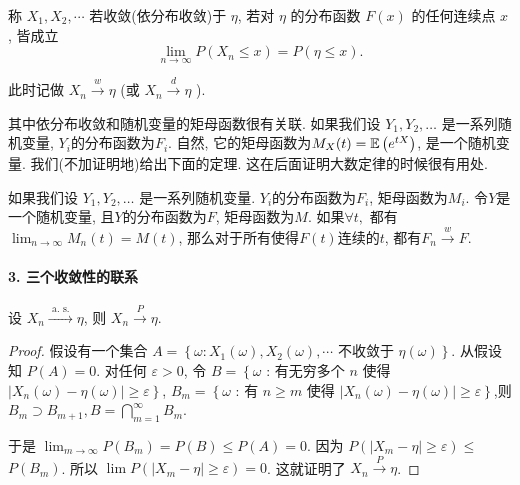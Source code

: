 \begin{definition}
    称 $X_1, X_2, \cdots$ 若收敛(依分布收敛)于 $\eta$, 若对 $\eta$ 的分布函数 $F(x)$ 的任何连续点 $x$, 皆成立
    $$
    \lim _{n \rightarrow \infty} P\left(X_n \leq x\right)=P(\eta \leq x) .
    $$
    
    此时记做 $X_n \stackrel{w}{\longrightarrow} \eta$ (或 $X_n \stackrel{d}{\longrightarrow} \eta$ ).
\end{definition}

其中依分布收敛和随机变量的矩母函数很有关联. 如果我们设 $Y_1, Y_2, \dots$ 是一系列随机变量, $Y_i$的分布函数为$F_i$. 自然, 它的矩母函数为$M_X(t)=\mathbb E\left( e^{t X}\right)$, 是一个随机变量. 我们(不加证明地)给出下面的定理. 这在后面证明大数定律的时候很有用处. 

\begin{theorem}
    \label{thm:dist-moment}
    如果我们设 $Y_1, Y_2, \dots$ 是一系列随机变量. $Y_i$的分布函数为$F_i$, 矩母函数为$M_i$. 令$Y$是一个随机变量, 且$Y$的分布函数为$F$, 矩母函数为$M$. 如果$\forall t,$ 都有$\lim _{n \rightarrow \infty} M_n(t)=M(t)$, 那么对于所有使得$F(t)$连续的$t$, 都有$F_n \stackrel{w}{\longrightarrow} F$. 
\end{theorem}

\paragraph{3. 三个收敛性的联系}

\begin{theorem}
    设 $X_n \stackrel{\text { a. s. }}{\longrightarrow} \eta$, 则 $X_n \stackrel{P}{\longrightarrow} \eta$.
\end{theorem}

\begin{proof}
    假设有一个集合 $A=\left\{\omega: X_1(\omega), X_2(\omega), \cdots\right.$ 不收敛于 $\left.\eta(\omega)\right\}$. 从假设知 $P(A)=0$. 对任何 $\varepsilon>0$, 令
$B=\left\{\omega\right.$ : 有无穷多个 $n$ 使得 $\left.\left|X_n(\omega)-\eta(\omega)\right| \geq \varepsilon\right\}$,
$B_m=\left\{\omega\right.$ : 有 $n \geq m$ 使得 $\left.\left|X_n(\omega)-\eta(\omega)\right| \geq \varepsilon\right\}$,则 $B_m \supset B_{m+1}, B=\bigcap_{m=1}^{\infty} B_m$.

于是 $\lim _{m \rightarrow \infty} P\left(B_m\right)=P(B) \leq P(A)=0$. 因为 $P\left(\left|X_m-\eta\right| \geq \varepsilon\right) \leq$ $P\left(B_m\right)$. 所以 $\lim P\left(\left|X_m-\eta\right| \geq \varepsilon\right)=0$. 这就证明了 $X_n \stackrel{P}{\longrightarrow} \eta$.
\end{proof}

